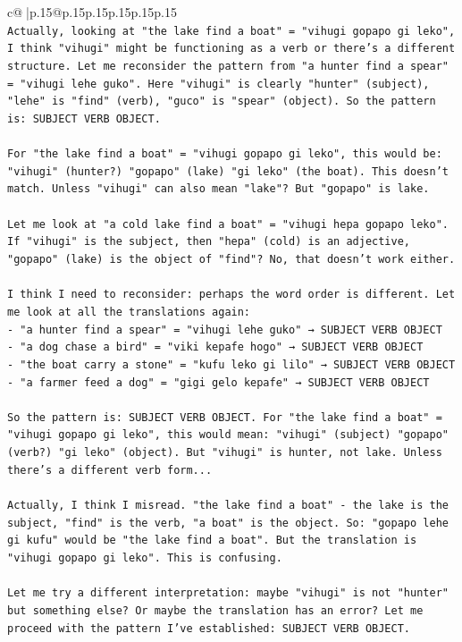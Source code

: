 \documentclass{article}
\begin{document}
{\begin{supertabular}{c@{$\;$}|p{.15\linewidth}@{}p{.15\linewidth}p{.15\linewidth}p{.15\linewidth}p{.15\linewidth}p{.15\linewidth}}
{{{\\ 
\texttt{Actually, looking at "the lake find a boat" = "vihugi gopapo gi leko", I think "vihugi" might be functioning as a verb or there's a different structure. Let me reconsider the pattern from "a hunter find a spear" = "vihugi lehe guko". Here "vihugi" is clearly "hunter" (subject), "lehe" is "find" (verb), "guco" is "spear" (object). So the pattern is: SUBJECT VERB OBJECT.} \\
\\ 
\texttt{For "the lake find a boat" = "vihugi gopapo gi leko", this would be: "vihugi" (hunter?) "gopapo" (lake) "gi leko" (the boat). This doesn't match. Unless "vihugi" can also mean "lake"? But "gopapo" is lake. } \\
\\ 
\texttt{Let me look at "a cold lake find a boat" = "vihugi hepa gopapo leko". If "vihugi" is the subject, then "hepa" (cold) is an adjective, "gopapo" (lake) is the object of "find"? No, that doesn't work either.} \\
\\ 
\texttt{I think I need to reconsider: perhaps the word order is different. Let me look at all the translations again:} \\
\texttt{{-} "a hunter find a spear" = "vihugi lehe guko" → SUBJECT VERB OBJECT} \\
\texttt{{-} "a dog chase a bird" = "viki kepafe hogo" → SUBJECT VERB OBJECT} \\
\texttt{{-} "the boat carry a stone" = "kufu leko gi lilo" → SUBJECT VERB OBJECT} \\
\texttt{{-} "a farmer feed a dog" = "gigi gelo kepafe" → SUBJECT VERB OBJECT} \\
\\ 
\texttt{So the pattern is: SUBJECT VERB OBJECT. For "the lake find a boat" = "vihugi gopapo gi leko", this would mean: "vihugi" (subject) "gopapo" (verb?) "gi leko" (object). But "vihugi" is hunter, not lake. Unless there's a different verb form...} \\
\\ 
\texttt{Actually, I think I misread. "the lake find a boat" {-} the lake is the subject, "find" is the verb, "a boat" is the object. So: "gopapo lehe gi kufu" would be "the lake find a boat". But the translation is "vihugi gopapo gi leko". This is confusing.} \\
\\ 
\texttt{Let me try a different interpretation: maybe "vihugi" is not "hunter" but something else? Or maybe the translation has an error? Let me proceed with the pattern I've established: SUBJECT VERB OBJECT.} \\
}}}
\end{supertabular}}
\end{document}
